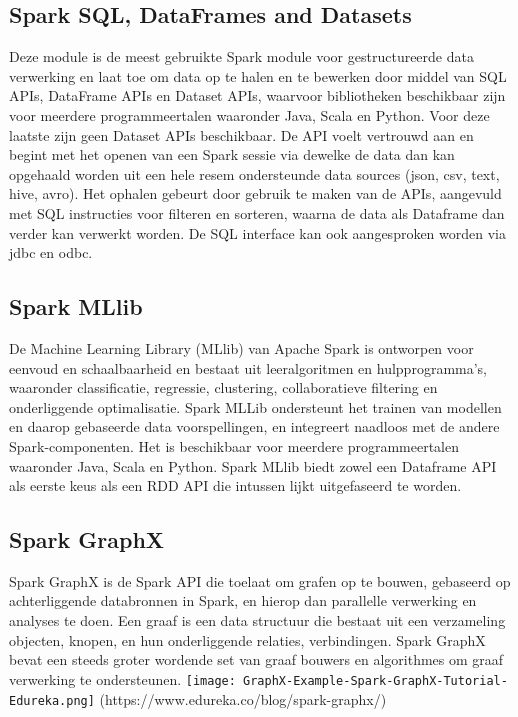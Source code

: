 \subsection{Spark SQL, DataFrames and Datasets}
Deze module is de meest gebruikte Spark module voor gestructureerde data verwerking en laat toe om data op te halen en te bewerken door middel van SQL APIs, DataFrame APIs en Dataset APIs, waarvoor bibliotheken beschikbaar zijn voor meerdere programmeertalen waaronder Java, Scala en Python. Voor deze laatste zijn geen Dataset APIs beschikbaar.
De API voelt vertrouwd aan en begint met het openen van een Spark sessie via dewelke de data dan kan opgehaald worden uit een hele resem ondersteunde data sources (json, csv, text, hive, avro). Het ophalen gebeurt door gebruik te maken van de APIs, aangevuld met SQL instructies voor filteren en sorteren, waarna de data als Dataframe dan verder kan verwerkt worden.
De SQL interface kan ook aangesproken worden via jdbc en odbc.

\textcite{Spark2023}
\textcite{Naveen2023}
\textcite{Spark2023a}


\subsection{Spark MLlib}
De Machine Learning Library (MLlib) van Apache Spark is ontworpen voor eenvoud en schaalbaarheid  en bestaat uit leeralgoritmen en hulpprogramma's, waaronder classificatie, regressie, clustering, collaboratieve filtering en onderliggende optimalisatie. Spark MLLib ondersteunt het trainen van modellen en daarop gebaseerde data voorspellingen, en integreert naadloos met de andere Spark-componenten. Het is beschikbaar voor meerdere programmeertalen waaronder Java, Scala en Python.
Spark MLlib biedt zowel een Dataframe API als eerste keus als een RDD API die intussen lijkt uitgefaseerd te worden.

\textcite{Spark2023b}

\subsection{Spark GraphX}
Spark GraphX is de Spark API die toelaat om grafen op te bouwen, gebaseerd op achterliggende databronnen in Spark, en hierop dan parallelle verwerking en analyses te doen. 
Een graaf is een data structuur die bestaat uit een verzameling objecten, knopen, en hun onderliggende relaties, verbindingen.
Spark GraphX bevat een steeds groter wordende set van graaf bouwers en algorithmes om graaf verwerking te ondersteunen.
\textcite{Dayananda2019}
\textcite{Wikipedia2023}
\newline
\newline
\texttt{[image: GraphX-Example-Spark-GraphX-Tutorial-Edureka.png]}
(https://www.edureka.co/blog/spark-graphx/)


